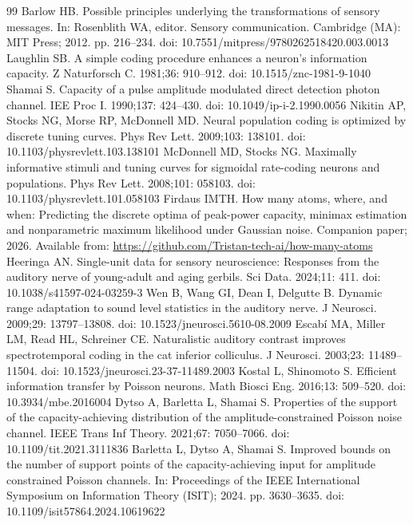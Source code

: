 \documentclass[10pt,letterpaper]{article}
\begin{document}
\begin{thebibliography}{99}
 Barlow HB. Possible principles underlying the transformations of sensory messages. In: Rosenblith WA, editor. Sensory communication. Cambridge (MA): MIT Press; 2012. pp. 216--234. doi: 10.7551/mitpress/9780262518420.003.0013%
 Laughlin SB. A simple coding procedure enhances a neuron's information capacity. Z Naturforsch C. 1981;36: 910--912. doi: 10.1515/znc-1981-9-1040
 Shamai S. Capacity of a pulse amplitude modulated direct detection photon channel. IEE Proc I. 1990;137: 424--430. doi: 10.1049/ip-i-2.1990.0056
 Nikitin AP, Stocks NG, Morse RP, McDonnell MD. Neural population coding is optimized by discrete tuning curves. Phys Rev Lett. 2009;103: 138101. doi: 10.1103/physrevlett.103.138101
 McDonnell MD, Stocks NG. Maximally informative stimuli and tuning curves for sigmoidal rate-coding neurons and populations. Phys Rev Lett. 2008;101: 058103. doi: 10.1103/physrevlett.101.058103
 Firdaus IMTH. How many atoms, where, and when: Predicting the discrete optima of peak-power capacity, minimax estimation and nonparametric maximum likelihood under Gaussian noise. Companion paper; 2026. Available from: \url{https://github.com/Tristan-tech-ai/how-many-atoms}
 Heeringa AN. Single-unit data for sensory neuroscience: Responses from the auditory nerve of young-adult and aging gerbils. Sci Data. 2024;11: 411. doi: 10.1038/s41597-024-03259-3
 Wen B, Wang GI, Dean I, Delgutte B. Dynamic range adaptation to sound level statistics in the auditory nerve. J Neurosci. 2009;29: 13797--13808. doi: 10.1523/jneurosci.5610-08.2009
 Escabí MA, Miller LM, Read HL, Schreiner CE. Naturalistic auditory contrast improves spectrotemporal coding in the cat inferior colliculus. J Neurosci. 2003;23: 11489--11504. doi: 10.1523/jneurosci.23-37-11489.2003
 Kostal L, Shinomoto S. Efficient information transfer by Poisson neurons. Math Biosci Eng. 2016;13: 509--520. doi: 10.3934/mbe.2016004
 Dytso A, Barletta L, Shamai S. Properties of the support of the capacity-achieving distribution of the amplitude-constrained Poisson noise channel. IEEE Trans Inf Theory. 2021;67: 7050--7066. doi: 10.1109/tit.2021.3111836
 Barletta L, Dytso A, Shamai S. Improved bounds on the number of support points of the capacity-achieving input for amplitude constrained Poisson channels. In: Proceedings of the IEEE International Symposium on Information Theory (ISIT); 2024. pp. 3630--3635. doi: 10.1109/isit57864.2024.10619622

\end{thebibliography}
\end{document}
